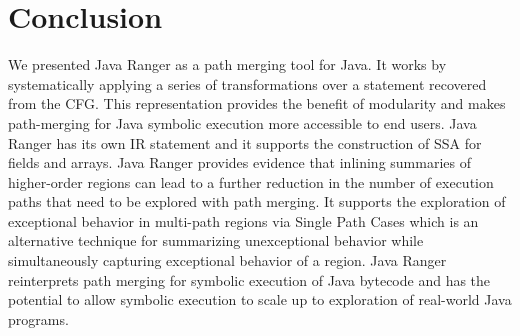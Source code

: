\section{Conclusion}
\label{sec:future}

We presented Java Ranger as a path merging tool for Java.
%
It works by systematically applying a series of transformations over a statement recovered from the CFG. This
representation provides the benefit of modularity and makes path-merging for Java symbolic execution more accessible to
end users.
%
Java Ranger has its own IR statement and it supports the construction of SSA for fields and arrays.
%
Java Ranger provides evidence that inlining summaries of higher-order regions can lead to a further reduction in the
number of execution paths that need to be explored with path merging.
%
It supports the exploration of exceptional behavior in multi-path regions via Single Path Cases which is an alternative
technique for summarizing unexceptional behavior while simultaneously capturing exceptional behavior of a region.
%
Java Ranger reinterprets path merging for symbolic execution of Java bytecode and has the potential to allow symbolic
execution to scale up to exploration of real-world Java programs.


